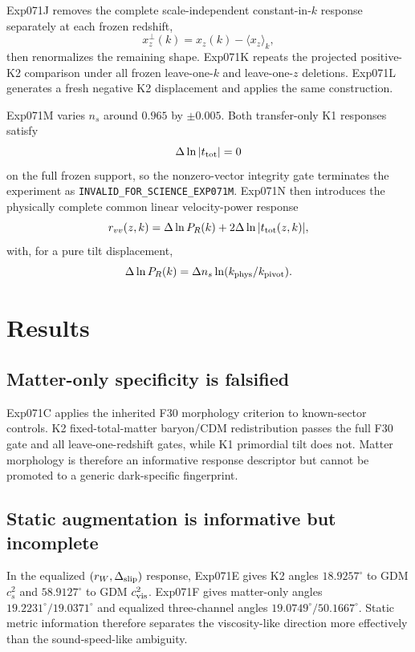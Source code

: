 \documentclass[11pt]{article}
\newcommand{\ttot}{t_{\rm tot}}
\newcommand{\dln}{\Delta\ln}
\begin{document}
Exp071J removes the complete scale-independent constant-in-$k$ response separately at each frozen redshift,
\begin{equation}
x_z^\perp(k)=x_z(k)-\langle x_z\rangle_k,
\end{equation}
then renormalizes the remaining shape. Exp071K repeats the projected positive-K2 comparison under all frozen leave-one-$k$ and leave-one-$z$ deletions. Exp071L generates a fresh negative K2 displacement and applies the same construction.

Exp071M varies $n_s$ around $0.965$ by $\pm0.005$. Both transfer-only K1 responses satisfy
\begin{equation}
\dln|\ttot|=0
\end{equation}
on the full frozen support, so the nonzero-vector integrity gate terminates the experiment as \texttt{INVALID\_FOR\_SCIENCE\_EXP071M}. Exp071N then introduces the physically complete common linear velocity-power response
\begin{equation}
r_{vv}(z,k)=\dln P_R(k)+2\dln|\ttot(z,k)|,
\end{equation}
with, for a pure tilt displacement,
\begin{equation}
\dln P_R(k)=\Delta n_s\ln(k_{\rm phys}/k_{\rm pivot}).
\end{equation}



\section{Results}
\subsection{Matter-only specificity is falsified}
Exp071C applies the inherited F30 morphology criterion to known-sector controls. K2 fixed-total-matter baryon/CDM redistribution passes the full F30 gate and all leave-one-redshift gates, while K1 primordial tilt does not. Matter morphology is therefore an informative response descriptor but cannot be promoted to a generic dark-specific fingerprint.

\subsection{Static augmentation is informative but incomplete}
In the equalized $(r_W,\Delta_{\rm slip})$ response, Exp071E gives K2 angles $18.9257^\circ$ to GDM $c_s^2$ and $58.9127^\circ$ to GDM $c_{\rm vis}^2$. Exp071F gives matter-only angles $19.2231^\circ/19.0371^\circ$ and equalized three-channel angles $19.0749^\circ/50.1667^\circ$. Static metric information therefore separates the viscosity-like direction more effectively than the sound-speed-like ambiguity.
\end{document}
